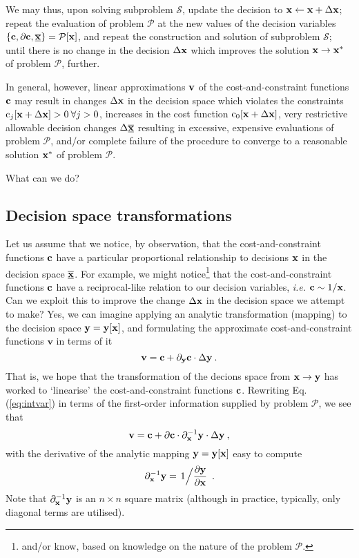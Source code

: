 \documentclass[11pt]{article}
\begin{document}
We may thus, upon solving subproblem $\mathcal{S}$, update the decision to $\mathbf{x} \gets \mathbf{x} + \Delta \mathbf{x}$; repeat the evaluation of problem $\mathcal{P}$ at the new values of the decision variables $\left\{\mathbf{c}, \partial \mathbf{c}, \underline{\overline{\mathbf{x}}}\right\}=\mathcal{P}[\mathbf{x}]$, and repeat the construction and solution of subproblem $\mathcal{S}$; until there is no change in the decision $\Delta \mathbf{x}$ which improves the solution $\mathbf{x} \to \mathbf{x}^\ast$ of problem $\mathcal{P}$, further. 

In general, however, linear approximations $\mathbf{v}$ of the cost-and-constraint functions $\mathbf{c}$ may result in changes $\Delta \mathbf{x}$ in the decision space which violates the constraints $\textrm{c}_j[\mathbf{x} + \Delta \mathbf{x}] > 0 \: \forall j > 0$, increases in the cost function $\textrm{c}_0[\mathbf{x} + \Delta \mathbf{x}]$, very restrictive allowable decision changes $\Delta \underline{\overline{\mathbf{x}}}$ resulting in excessive, expensive evaluations of problem $\mathcal{P}$, and/or complete failure of the procedure to converge to a reasonable solution $\mathbf{x}^\ast$ of problem $\mathcal{P}$.

What can we do?

\subsection{Decision space transformations}

Let us assume that we notice, by observation, that the cost-and-constraint functions $\mathbf{c}$ have a particular proportional relationship to decisions $\mathbf{x}$ in the decision space $\underline{\overline{\mathbf{x}}}$. For example, we might notice\footnote{and/or know, based on knowledge on the nature of the problem $\mathcal{P}$.} that the cost-and-constraint functions $\mathbf{c}$ have a reciprocal-like relation to our decision variables, \emph{i.e.} $\mathbf{c} \sim 1/\mathbf{x}$. Can we exploit this to improve the change $\Delta \mathbf{x}$ in the decision space we attempt to make? Yes, we can imagine applying an analytic transformation (mapping) to the decision space $\mathbf{y} = \mathbf{y}[\mathbf{x}]$, and formulating the approximate cost-and-constraint functions $\textbf{v}$ in terms of it
\begin{equation}
\label{eq:intvar}
    \textbf{v} = \mathbf{c} +   \partial_{\mathbf{y}} \mathbf{c} \cdot \Delta \mathbf{y} \:.
\end{equation}
That is, we hope that the transformation of the decions space from $\mathbf{x} \to \mathbf{y}$ has worked to `linearise' the cost-and-constraint functions $\mathbf{c}$. Rewriting Eq. (\ref{eq:intvar}) in terms of the first-order information supplied by problem $\mathcal{P}$, we see that
\begin{equation}
    \textbf{v} = \mathbf{c} + \partial \mathbf{c} \cdot \partial_{\mathbf{x}}^{-1} \mathbf{y} \cdot  \Delta \mathbf{y}    \:,
\end{equation}
with the derivative of the analytic mapping $\mathbf{y} = \mathbf{y}[\mathbf{x}]$ easy to compute
\begin{equation}
    \partial_{\mathbf{x}}^{-1} \mathbf{y} = \left. 1 \Big/ \frac{\partial \mathbf{y}}{\partial \mathbf{x}}\right. \: .
\end{equation}
Note that  $\partial_{\mathbf{x}}^{-1}\mathbf{y}$ is an $n \times n$ square matrix (although in practice, typically, only diagonal terms are utilised).
\end{document}

